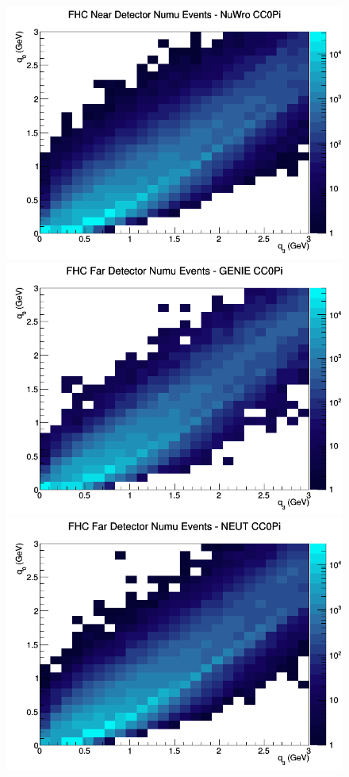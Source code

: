 \begin{figure}[h]
\includegraphics[width=\linewidth]{eff_q0_q3/LAr/CC0Pi_FHC_ND_numu_q3_q0_NuWro.png}
\endminipage
\newline
{}
\includegraphics[width=\linewidth]{eff_q0_q3/LAr/CC0Pi_FHC_FD_numu_q3_q0_GENIE.png}
\endminipage
{}
\includegraphics[width=\linewidth]{eff_q0_q3/LAr/CC0Pi_FHC_FD_numu_q3_q0_NEUT.png}

\end{figure}
